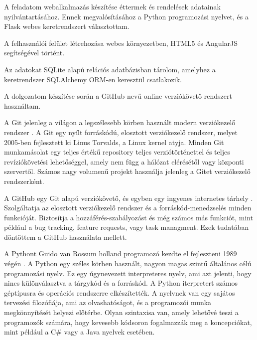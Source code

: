 

A feladatom webalkalmazás készítése éttermek és rendelések adatainak nyilvántartásához. Ennek megvalósításához a Python programozási nyelvet, és a Flask webes keretrendszert választottam.

A felhasználói felület létrehozása webes környezetben, HTML5 és AngularJS segítségével történt.

Az adatokat SQLite alapú relációs adatbázisban tárolom, amelyhez a keretrendszer SQLAlchemy ORM-en keresztül csatlakozik. 

A dolgozatom készítése során a GitHub nevű online verziókövető rendszert használtam.


A Git jelenleg a világon a legszélesebb körben használt modern verziókezelő rendszer \cite{git}. A Git egy nyílt forráskódú, elosztott verziókezelő rendszer, melyet 2005-ben fejlesztett ki Linus Torvalds, a Linux kernel atyja. Minden Git munkamásolat egy teljes értékű repository teljes verziótörténettel és teljes revíziókövetési lehetőséggel, amely nem függ a hálózat elérésétől vagy központi szervertől. Számos nagy volumenű projekt használja jelenleg a Gitet verziókezelő rendszerként.


A GitHub egy Git alapú verziókövető, és egyben egy ingyenes internetes tárhely \cite{github}. Szolgáltatja az elosztott verziókezelő rendszer és a forráskód-menedzselés minden funkcióját. Biztosítja a hozzáférés-szabályozást és még számos más funkciót, mint például a bug tracking, feature requests, vagy task managment. Ezek tudatában döntöttem a GitHub használata mellett.


A Pythont Guido van Rossum holland programozó kezdte el fejleszteni 1989 végén \cite{python}. A Python egy széles körben használt, nagyon magas szintű általános célú programozási nyelv. Ez egy úgynevezett interpreteres nyelv, ami azt jelenti, hogy nincs különválasztva a tárgykód és a forráskód. A Python iterpretert számos géptípusra és operációs rendszerre elkészítették. A nyelvnek van egy sajátos tervezési filozófiája, ami az olvashatóságot, és a programozói munka megkönnyítését helyezi előtérbe. Olyan szintaxisa van, amely lehetővé teszi a programozók számára, hogy kevesebb kódsoron fogalmazzák meg a koncepciókat, mint például a C\# vagy a Java nyelvek esetében.

